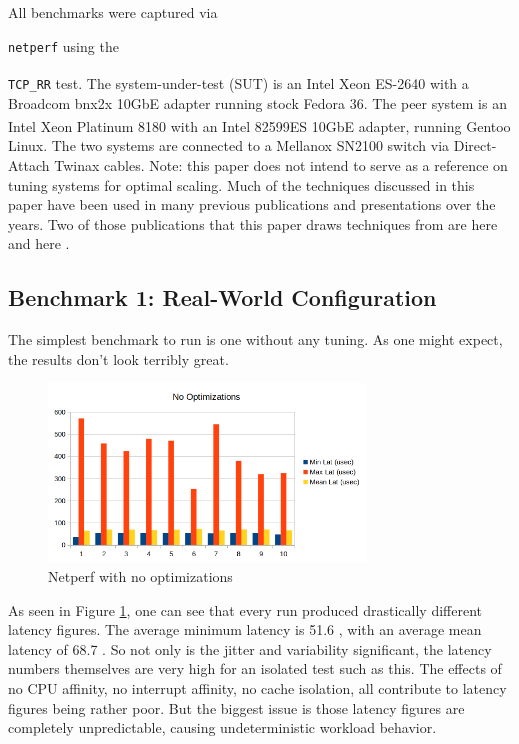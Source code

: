 \documentclass[letterpaper]{article}
\begin{document}
All benchmarks were captured via {\small{\texttt{netperf}} \cite{netperf} using the {\small{\texttt{TCP\_RR}} test. The system-under-test (SUT) is an Intel\textsuperscript{\textregistered} Xeon\textsuperscript{\textregistered} ES-2640 with a Broadcom bnx2x 10GbE adapter running stock Fedora 36.  The peer system is an Intel\textsuperscript{\textregistered} Xeon\textsuperscript{\textregistered} Platinum 8180 with an Intel\textsuperscript{\textregistered} 82599ES 10GbE adapter, running Gentoo Linux.  The two systems are connected to a Mellanox SN2100 switch via Direct-Attach Twinax cables.
\newline
\newline
Note: this paper does not intend to serve as a reference on tuning systems for optimal scaling. Much of the techniques discussed in this paper have been used in many previous publications and presentations over the years. Two of those publications that this paper draws techniques from are here \cite{nema2010} and here \cite{luca2010}.
\subsection{Benchmark 1: Real-World Configuration}
The simplest benchmark to run is one without any tuning.  As one might expect, the results don't look terribly great.

\begin{figure}[h]
\includegraphics[width=3.31in]{netperf-no-opt.png}
\caption{Netperf with no optimizations}
\label{netperf-no-opt}
\end{figure}

As seen in Figure \ref{netperf-no-opt}, one can see that every run produced drastically different latency figures.  The average minimum latency is 51.6 , with an average mean latency of 68.7 .  So not only is the jitter and variability significant, the latency numbers themselves are very high for an isolated test such as this.
\newline
\newline
The effects of no CPU affinity, no interrupt affinity, no cache isolation, all contribute to latency figures being rather poor. But the biggest issue is those latency figures are completely unpredictable, causing undeterministic workload behavior.
}}
\end{document}
